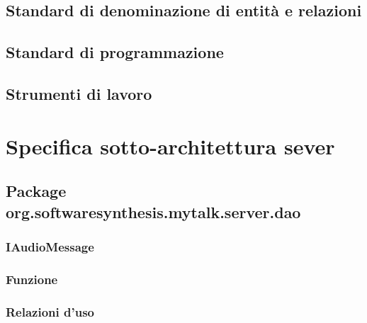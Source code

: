 \subsection{Standard di denominazione di entità e relazioni}

\subsection{Standard di programmazione}

\subsection{Strumenti di lavoro}

\clearpage

\section{Specifica sotto-architettura sever}\label{sec:serverarchitecture}

\subsection{Package org.softwaresynthesis.mytalk.server.dao}\label{sec:dao}

\subsubsection{IAudioMessage}\label{sec:iaudiomessage}
\subsubsection*{Funzione}

\subsubsection*{Relazioni d'uso}


